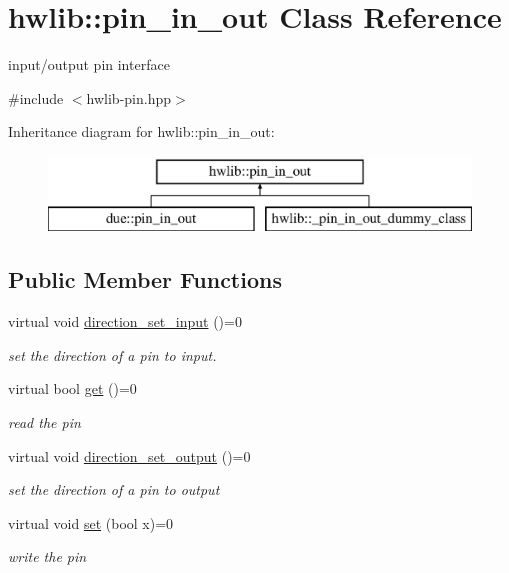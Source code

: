 \hypertarget{classhwlib_1_1pin__in__out}{}\section{hwlib\+:\+:pin\+\_\+in\+\_\+out Class Reference}
\label{classhwlib_1_1pin__in__out}


input/output pin interface  




{\ttfamily \#include $<$hwlib-\/pin.\+hpp$>$}

Inheritance diagram for hwlib\+:\+:pin\+\_\+in\+\_\+out\+:\begin{figure}[H]
\begin{center}
\leavevmode
\includegraphics[height=2.000000cm]{classhwlib_1_1pin__in__out}
\end{center}
\end{figure}
\subsection*{Public Member Functions}
\begin{DoxyCompactItemize}
\item 
virtual void \hyperlink{classhwlib_1_1pin__in__out_a54ce1a5086d3c9e7b868511b1d46acd0}{direction\+\_\+set\+\_\+input} ()=0
\begin{DoxyCompactList}\small\item\em set the direction of a pin to input. \end{DoxyCompactList}\item 
virtual bool \hyperlink{classhwlib_1_1pin__in__out_a298d32c19a8f94b730d34d4496bcf3ae}{get} ()=0
\begin{DoxyCompactList}\small\item\em read the pin \end{DoxyCompactList}\item 
virtual void \hyperlink{classhwlib_1_1pin__in__out_ad08a5f5e9a4c3aadaa7c665b98f2418e}{direction\+\_\+set\+\_\+output} ()=0
\begin{DoxyCompactList}\small\item\em set the direction of a pin to output \end{DoxyCompactList}\item 
virtual void \hyperlink{classhwlib_1_1pin__in__out_a198c4d27a9783f4c17e8f5dfd9aca6a9}{set} (bool x)=0
\begin{DoxyCompactList}\small\item\em write the pin \end{DoxyCompactList}\end{DoxyCompactItemize}


